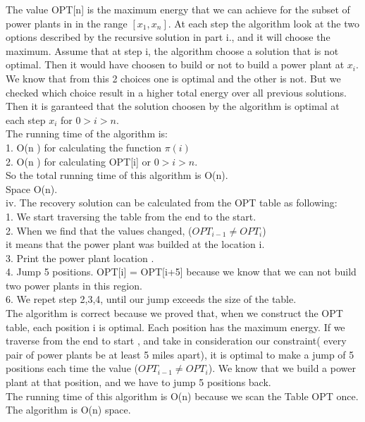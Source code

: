 \documentclass[11 pt]{article}
\begin{document}
 The value OPT[n] is the maximum energy that we can achieve for the subset of power plants in in the range $[x_1 , x_n]$. At each step the algorithm look at the two options described by the recursive solution in part i., and it will choose the maximum. Assume that at step i, the algorithm choose a solution that is not optimal. Then it would have choosen to build or not to build a power plant at $x_i$.
 We know that from this 2 choices one is optimal and the other is not. But we checked which choice result in a higher total energy over all previous solutions. Then  it is garanteed that the solution choosen by the algorithm  is optimal at each step $x_i$ for $ 0 > i > n$. \\
 The running time of the algorithm is: \\
 1. O(n ) for calculating the function $\pi (i)$\\
 2. O(n ) for calculating OPT[i] or $ 0 > i > n$. \\
 So the total running time of this algorithm is O(n).\\ 
 Space O(n).\\
 
 iv. The recovery solution can be calculated from the OPT table as following:\\
 1. We start traversing the table from the end to the start.\\
 2. When we find that the values changed, ($OPT_{i-1} \neq  OPT_{i} $)
 \\ it means that the power plant was builded at the location i. \\
 3. Print the power plant location . \\
 4. Jump 5 positions.  OPT[i] = OPT[i+5] because we know that we can not build two power plants in this region. \\
 6. We repet step 2,3,4, until our jump exceeds the size of the table. \\
 
 The algorithm is correct because we proved that, when we construct the OPT table, each position i is optimal. Each position has the maximum energy. If we traverse from the end to start , and take in consideration our constraint( every pair of power plants be at least 5 miles apart), it is optimal to make a jump of 5 positions each time the value   ($OPT_{i-1} \neq  OPT_{i} $). We know that we build a power plant at that position, and we have to jump 5 positions back. \\
 The running time of this algorithm is O(n) because we scan the Table OPT once.\\
 The algorithm is O(n) space. \\
\end{document}
